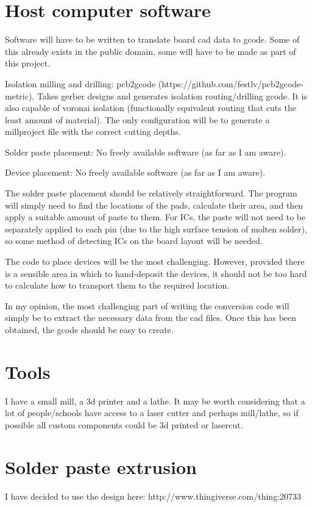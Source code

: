 \documentclass[a4paper,11pt]{article}  %
\begin{document}
\section{Host computer software}
Software will have to be written to translate board cad data to gcode. Some of this already exists in the public domain, some will have to be made
as part of this project.

Isolation milling and drilling: pcb2gcode (https://github.com/festlv/pcb2gcode-metric). Takes gerber designs and generates isolation routing/drilling
gcode. It is also capable of voronai isolation (functionally equivalent routing that cuts the least amount of material). The only configuration
will be to generate a millproject file with the correct cutting depths.

Solder paste placement: No freely available software (as far as I am aware).

Device placement: No freely available software (as far as I am aware).

The solder paste placement should be relatively straightforward. The program will simply need to find the locations of the pads, calculate their
area, and then apply a suitable amount of paste to them. For ICs, the paste will not need to be separately applied to each pin (due to the high
surface tension of molten solder), so some method of detecting ICs on the board layout will be needed.

The code to place devices will be the most challenging. However, provided there is a sensible area in which to hand-deposit the devices, it should
not be too hard to calculate how to transport them to the required location.

In my opinion, the most challenging part of writing the conversion code will simply be to extract the necessary data from the cad files. Once this
has been obtained, the gcode should be easy to create.

\section{Tools}
I have a small mill, a 3d printer and a lathe. It may be worth considering that a lot of people/schools have
access to a laser cutter and perhaps mill/lathe, so if possible all custom components could be 3d printed or 
lasercut.

\section{Solder paste extrusion}
I have decided to use the design here: http://www.thingiverse.com/thing:20733
\end{document}
